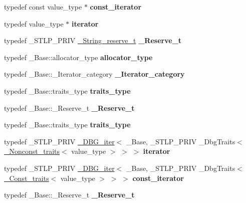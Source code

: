\begin{DoxyCompactItemize}
typedef const value\+\_\+type $\ast$ {\bfseries const\+\_\+iterator}
\item 
\mbox{\label{classbasic__string_a5ab82050b4c3f05ebeea25f43499a068}} 
typedef value\+\_\+type $\ast$ {\bfseries iterator}
\item 
\mbox{\label{classbasic__string_acd0895c7204fc9a00102f26d7f232046}} 
typedef \+\_\+\+S\+T\+L\+P\+\_\+\+P\+R\+IV \hyperlink{struct___string__reserve__t}{\+\_\+\+String\+\_\+reserve\+\_\+t} {\bfseries \+\_\+\+Reserve\+\_\+t}
\item 
\mbox{\label{classbasic__string_ac77e0df04f99459a148afbfb07edced6}} 
typedef \+\_\+\+Base\+::allocator\+\_\+type {\bfseries allocator\+\_\+type}
\item 
\mbox{\label{classbasic__string_ad17605462ddf6407b3c549a8b83e501b}} 
typedef \+\_\+\+Base\+::\+\_\+\+Iterator\+\_\+category {\bfseries \+\_\+\+Iterator\+\_\+category}
\item 
\mbox{\label{classbasic__string_a9d1d9ab49dfd96e460c32e2facc46ffb}} 
typedef \+\_\+\+Base\+::traits\+\_\+type {\bfseries traits\+\_\+type}
\item 
\mbox{\label{classbasic__string_a9500723a62e3e70c05a188d51076c859}} 
typedef \+\_\+\+Base\+::\+\_\+\+Reserve\+\_\+t {\bfseries \+\_\+\+Reserve\+\_\+t}
\item 
\mbox{\label{classbasic__string_a9d1d9ab49dfd96e460c32e2facc46ffb}} 
typedef \+\_\+\+Base\+::traits\+\_\+type {\bfseries traits\+\_\+type}
\item 
\mbox{\label{classbasic__string_a058b1f2e04b3aaac5ebd9a8b3f6bedf9}} 
typedef \+\_\+\+S\+T\+L\+P\+\_\+\+P\+R\+IV \hyperlink{struct___d_b_g__iter}{\+\_\+\+D\+B\+G\+\_\+iter}$<$ \+\_\+\+Base, \+\_\+\+S\+T\+L\+P\+\_\+\+P\+R\+IV \+\_\+\+Dbg\+Traits$<$ \hyperlink{struct___nonconst__traits}{\+\_\+\+Nonconst\+\_\+traits}$<$ value\+\_\+type $>$ $>$ $>$ {\bfseries iterator}
\item 
\mbox{\label{classbasic__string_a67606e20b1e648ce20ca061f1fe80d74}} 
typedef \+\_\+\+S\+T\+L\+P\+\_\+\+P\+R\+IV \hyperlink{struct___d_b_g__iter}{\+\_\+\+D\+B\+G\+\_\+iter}$<$ \+\_\+\+Base, \+\_\+\+S\+T\+L\+P\+\_\+\+P\+R\+IV \+\_\+\+Dbg\+Traits$<$ \hyperlink{struct___const__traits}{\+\_\+\+Const\+\_\+traits}$<$ value\+\_\+type $>$ $>$ $>$ {\bfseries const\+\_\+iterator}
\item 
\mbox{\label{classbasic__string_a9500723a62e3e70c05a188d51076c859}} 
typedef \+\_\+\+Base\+::\+\_\+\+Reserve\+\_\+t {\bfseries \+\_\+\+Reserve\+\_\+t}
\end{DoxyCompactItemize}
